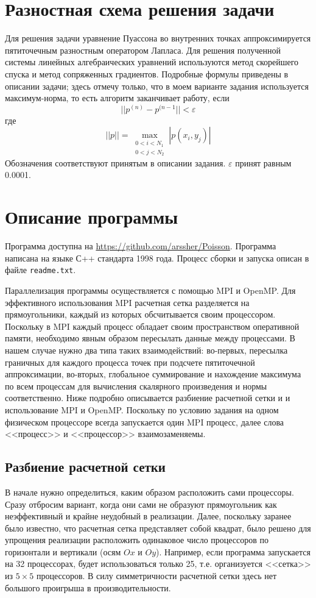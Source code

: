 \documentclass[12pt,notitlepage,oneside]{extarticle}
\begin{document}
\section{Разностная схема решения задачи}
Для решения задачи уравнение Пуассона во внутренних точках аппроксимируется
пятиточечным разностным оператором Лапласа. Для решения полученной системы линейных
алгебраических уравнений используются метод скорейшего спуска и метод
сопряженных градиентов. Подробные формулы приведены в описании задачи; здесь
отмечу только, что в моем варианте задания используется максимум-норма, то есть
алгоритм заканчивает работу, если
\[
  \lvert \lvert p^{(n)} - p^{(n-1} \rvert \rvert < \varepsilon
\]
где
\[
  \lvert \lvert p \rvert \rvert = \max_{\substack{0 < i < N_1 \\ 0 < j < N_2}} |p(x_i, y_j)|
\]
Обозначения соответствуют принятым в описании задания. $\varepsilon$ принят
равным 0.0001.

\section{Описание программы}
Программа доступна на \url{https://github.com/arssher/Poisson}. Программа
написана на языке С++ стандарта 1998 года. Процесс сборки и запуска описан в
файле \texttt{readme.txt}.

Параллелизация программы осуществляется с помощью MPI и OpenMP. Для эффективного
использования MPI расчетная сетка разделяется на прямоугольники, каждый из
которых обсчитывается своим процессором. Поскольку в MPI каждый процесс
обладает своим пространством оперативной памяти, необходимо явным образом
пересылать данные между процессами. В нашем случае нужно два типа таких
взаимодействий: во-первых, пересылка граничных для каждого процесса точек
при подсчете пятиточечной аппроксимации, во-вторых, глобальное суммирование и
нахождение максимума по всем процессам для вычисления скалярного произведения
и нормы соответственно. Ниже подробно описывается разбиение расчетной сетки и
и использование MPI и OpenMP. Поскольку по условию задания на одном физическом
процессоре всегда запускается один MPI процесс, далее слова <<процесс>> и
<<процессор>> взаимозаменяемы.

\subsection{Разбиение расчетной сетки}
В начале нужно определиться, каким образом расположить сами процессоры.  Сразу
отбросим вариант, когда они сами не образуют прямоугольник как неэффективный и
крайне неудобный в реализации. Далее, поскольку заранее было известно, что
расчетная сетка представляет собой квадрат, было решено для упрощения реализации
расположить одинаковое число процессоров по горизонтали и вертикали (осям $Ox$ и
$Oy$). Например, если программа запускается на 32 процессорах, будет
использоваться только 25, т.е. организуется <<сетка>> из $5 \times 5$
процессоров. В силу симметричности расчетной сетки здесь нет большого проигрыша
в производительности.
\end{document}
